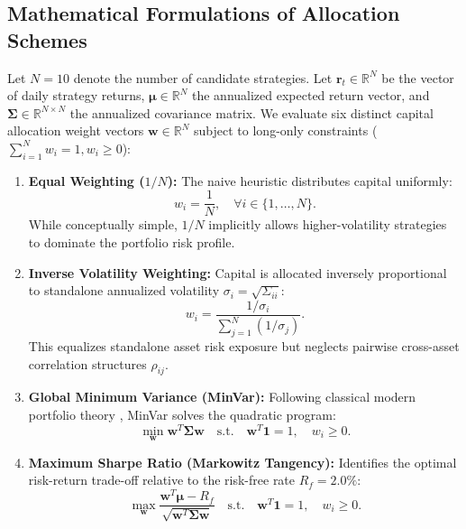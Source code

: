 \documentclass[11pt,a4paper]{article}
\begin{document}
\subsection{Mathematical Formulations of Allocation Schemes}
Let $N = 10$ denote the number of candidate strategies. Let $\mathbf{r}_t \in \mathbb{R}^N$ be the vector of daily strategy returns, $\boldsymbol{\mu} \in \mathbb{R}^N$ the annualized expected return vector, and $\boldsymbol{\Sigma} \in \mathbb{R}^{N \times N}$ the annualized covariance matrix. We evaluate six distinct capital allocation weight vectors $\mathbf{w} \in \mathbb{R}^N$ subject to long-only constraints ($\sum_{i=1}^N w_i = 1, w_i \ge 0$):

\begin{enumerate}
    \item \textbf{Equal Weighting ($1/N$):} The naive heuristic distributes capital uniformly:
    \begin{equation}
    w_i = \frac{1}{N}, \quad \forall i \in \{1, \dots, N\}.
    \end{equation}
    While conceptually simple, $1/N$ implicitly allows higher-volatility strategies to dominate the portfolio risk profile.
    
    \item \textbf{Inverse Volatility Weighting:} Capital is allocated inversely proportional to standalone annualized volatility $\sigma_i = \sqrt{\Sigma_{ii}}$:
    \begin{equation}
    w_i = \frac{1 / \sigma_i}{\sum_{j=1}^N (1 / \sigma_j)}.
    \end{equation}
    This equalizes standalone asset risk exposure but neglects pairwise cross-asset correlation structures $\rho_{ij}$.
    
    \item \textbf{Global Minimum Variance (MinVar):} Following classical modern portfolio theory \cite{markowitz1952portfolio}, MinVar solves the quadratic program:
    \begin{equation}
    \min_{\mathbf{w}} \mathbf{w}^T \boldsymbol{\Sigma} \mathbf{w} \quad \text{s.t.} \quad \mathbf{w}^T \mathbf{1} = 1, \quad w_i \ge 0.
    \end{equation}
    
    \item \textbf{Maximum Sharpe Ratio (Markowitz Tangency):} Identifies the optimal risk-return trade-off relative to the risk-free rate $R_f = 2.0\%$:
    \begin{equation}
    \max_{\mathbf{w}} \frac{\mathbf{w}^T \boldsymbol{\mu} - R_f}{\sqrt{\mathbf{w}^T \boldsymbol{\Sigma} \mathbf{w}}} \quad \text{s.t.} \quad \mathbf{w}^T \mathbf{1} = 1, \quad w_i \ge 0.
    \end{equation}
    

\end{enumerate}
\end{document}
